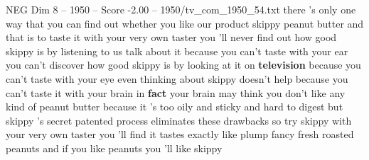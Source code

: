 \begin{textsample}{NEG Dim 8 – 1950 – Score -2.00 – 1950/tv\_com\_1950\_54.txt}  \label{ex:f8_neg_084}
there 's only one way that you can find out whether you like our product skippy peanut butter and that is to taste it with your very own taster you 'll never find out how good skippy is by listening to us talk about it because you can't taste with your ear you can't discover how good skippy is by looking at it on \textbf{television} because you can't taste with your eye even thinking about skippy doesn't help because you can't taste it with your brain in \textbf{fact} your brain may think you don't like any kind of peanut butter because it 's too oily and sticky and hard to digest but skippy 's secret patented process eliminates these drawbacks so try skippy with your very own taster you 'll find it tastes exactly like plump fancy fresh roasted peanuts and if you like peanuts you 'll like skippy

\end{textsample}
